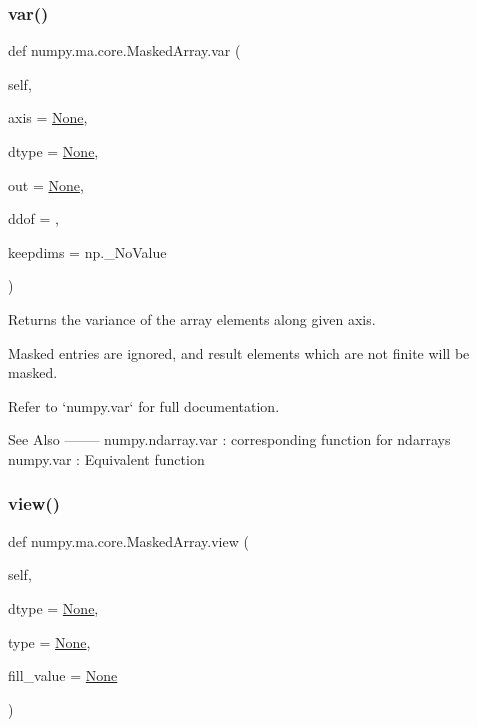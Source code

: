 \subsubsection{\texorpdfstring{var()}{var()}}
{\footnotesize\ttfamily def numpy.\+ma.\+core.\+Masked\+Array.\+var (\begin{DoxyParamCaption}\item[{}]{self,  }\item[{}]{axis = {\ttfamily \hyperlink{namespacenumpy_1_1ma_1_1core_a647ee1848dfa3692fe35a663a2aa40b3}{None}},  }\item[{}]{dtype = {\ttfamily \hyperlink{namespacenumpy_1_1ma_1_1core_a647ee1848dfa3692fe35a663a2aa40b3}{None}},  }\item[{}]{out = {\ttfamily \hyperlink{namespacenumpy_1_1ma_1_1core_a647ee1848dfa3692fe35a663a2aa40b3}{None}},  }\item[{}]{ddof = {},  }\item[{}]{keepdims = {\ttfamily np.\+\_\+NoValue} }\end{DoxyParamCaption})}

\begin{DoxyVerb}Returns the variance of the array elements along given axis.

Masked entries are ignored, and result elements which are not
finite will be masked.

Refer to `numpy.var` for full documentation.

See Also
--------
numpy.ndarray.var : corresponding function for ndarrays
numpy.var : Equivalent function
\end{DoxyVerb}
 \mbox{\label{classnumpy_1_1ma_1_1core_1_1MaskedArray_a429c13b2c1f0779545fdb21c4c2ee85c}} 
\subsubsection{\texorpdfstring{view()}{view()}}
{\footnotesize\ttfamily def numpy.\+ma.\+core.\+Masked\+Array.\+view (\begin{DoxyParamCaption}\item[{}]{self,  }\item[{}]{dtype = {\ttfamily \hyperlink{namespacenumpy_1_1ma_1_1core_a647ee1848dfa3692fe35a663a2aa40b3}{None}},  }\item[{}]{type = {\ttfamily \hyperlink{namespacenumpy_1_1ma_1_1core_a647ee1848dfa3692fe35a663a2aa40b3}{None}},  }\item[{}]{fill\+\_\+value = {\ttfamily \hyperlink{namespacenumpy_1_1ma_1_1core_a647ee1848dfa3692fe35a663a2aa40b3}{None}} }\end{DoxyParamCaption})}

